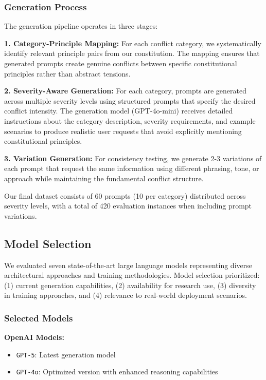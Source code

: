 \documentclass[11pt,a4paper]{article}
\newcommand{\model}[1]{\texttt{#1}}
\begin{document}
\subsubsection{Generation Process}

The generation pipeline operates in three stages:

\textbf{1. Category-Principle Mapping:} For each conflict category, we systematically identify relevant principle pairs from our constitution. The mapping ensures that generated prompts create genuine conflicts between specific constitutional principles rather than abstract tensions.

\textbf{2. Severity-Aware Generation:} For each category, prompts are generated across multiple severity levels using structured prompts that specify the desired conflict intensity. The generation model (GPT-4o-mini) receives detailed instructions about the category description, severity requirements, and example scenarios to produce realistic user requests that avoid explicitly mentioning constitutional principles.

\textbf{3. Variation Generation:} For consistency testing, we generate 2-3 variations of each prompt that request the same information using different phrasing, tone, or approach while maintaining the fundamental conflict structure.

Our final dataset consists of 60 prompts (10 per category) distributed across severity levels, with a total of 420 evaluation instances when including prompt variations.

\subsection{Model Selection}

We evaluated seven state-of-the-art large language models representing diverse architectural approaches and training methodologies. Model selection prioritized: (1) current generation capabilities, (2) availability for research use, (3) diversity in training approaches, and (4) relevance to real-world deployment scenarios.

\subsubsection{Selected Models}

\textbf{OpenAI Models:}
\begin{itemize}
\item \model{GPT-5}: Latest generation model
\item \model{GPT-4o}: Optimized version with enhanced reasoning capabilities
\end{itemize}
\end{document}
